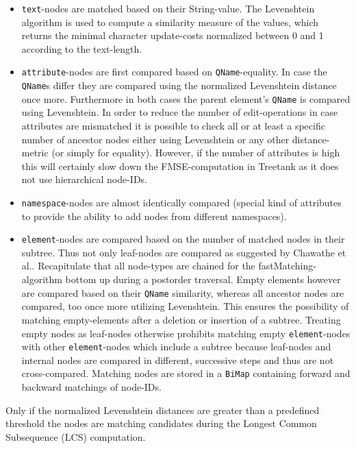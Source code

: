\begin{itemize}
\item \texttt{text}-nodes are matched based on their String-value. The Levenshtein algo\-rithm is used to compute a similarity measure of the values, which returns the minimal character update-costs normalized between 0 and 1 according to the text-length.

\item \texttt{attribute}-nodes are first compared based on \texttt{QName}-equality. In case the \texttt{QName}s differ they are compared using the normalized Levenshtein distance once more. Furthermore in both cases the parent element's \texttt{QName} is compared using Levenshtein. In order to reduce the number of edit-operations in case attributes are mismatched it is possible to check all or at least a specific number of ancestor nodes either using Levenshtein or any other distance-metric (or simply for equality). However, if the number of attributes is high this will certainly slow down the FMSE-computation in Treetank as it does not use hierarchical node-IDs.

\item \texttt{namespace}-nodes are almost identically compared (special kind of attributes to provide the ability to add nodes from different namespaces). 

\item \texttt{element}-nodes are compared based on the number of matched nodes in their subtree. Thus not only leaf-nodes are compared as suggested by Chawathe et al.. Recapitulate that all node-types are chained for the fast\-Matching-algorithm bottom up during a postorder traversal. Empty elements however are compared based on their \texttt{QName} similarity, whereas all ancestor nodes are compared, too once more utilizing Levenshtein. This ensures the possibility of matching empty-elements after a deletion or insertion of a subtree. Treating empty nodes as leaf-nodes otherwise prohibits matching empty \texttt{element}-nodes with other \texttt{element}-nodes which include a subtree because leaf-nodes and internal nodes are compared in different, successive steps and thus are not cross-compared. Matching nodes are stored in a \texttt{BiMap} containing forward and backward matchings of node-IDs.
\end{itemize}

Only if the normalized Levenshtein distances are greater than a predefined threshold the nodes are matching candidates during the Longest Common Subsequence (LCS) computation.

